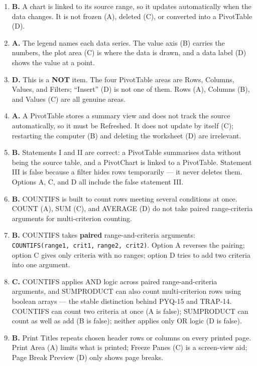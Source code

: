 \documentclass[11pt]{article}
\begin{document}
\begin{enumerate}[label=\textbf{Q\arabic*.}, leftmargin=*]
  numeric variables; a column chart (D) compares values across categories.
\item \textbf{B.} A chart is linked to its source range, so it updates
  automatically when the data changes. It is not frozen (A), deleted (C), or
  converted into a PivotTable (D).
\item \textbf{A.} The legend names each data series. The value axis (B) carries
  the numbers, the plot area (C) is where the data is drawn, and a data label
  (D) shows the value at a point.
\item \textbf{D.} This is a \textbf{NOT} item. The four PivotTable areas are
  Rows, Columns, Values, and Filters; ``Insert'' (D) is not one of them. Rows
  (A), Columns (B), and Values (C) are all genuine areas.
\item \textbf{A.} A PivotTable stores a summary view and does not track the
  source automatically, so it must be Refreshed. It does not update by itself
  (C); restarting the computer (B) and deleting the worksheet (D) are
  irrelevant.
\item \textbf{B.} Statements I and II are correct: a PivotTable summarises data
  without being the source table, and a PivotChart is linked to a PivotTable.
  Statement III is false because a filter hides rows temporarily --- it never
  deletes them. Options A, C, and D all include the false statement III.
\item \textbf{B.} COUNTIFS is built to count rows meeting several conditions at
  once. COUNT (A), SUM (C), and AVERAGE (D) do not take paired range-criteria
  arguments for multi-criterion counting.
\item \textbf{B.} COUNTIFS takes \textbf{paired} range-and-criteria arguments:
  \texttt{COUNTIFS(range1, crit1,} \texttt{range2, crit2)}. Option A reverses the
  pairing;
  option C gives only criteria with no ranges; option D tries to add two
  criteria into one argument.
\item \textbf{C.} COUNTIFS applies AND logic across paired range-and-criteria
  arguments, and SUMPRODUCT can also count multi-criterion rows using boolean
  arrays --- the stable distinction behind PYQ-15 and TRAP-14. COUNTIFS can
  count two criteria at once (A is false); SUMPRODUCT can count as well as add
  (B is false); neither applies only OR logic (D is false).
\item \textbf{B.} Print Titles repeats chosen header rows or columns on every
  printed page. Print Area (A) limits what is printed; Freeze Panes (C) is a
  screen-view aid; Page Break Preview (D) only shows page breaks.

\end{enumerate}
\end{document}
